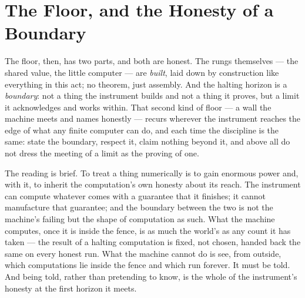 \section{The Floor, and the Honesty of a Boundary}

The floor, then, has two parts, and both are honest. The rungs themselves --- the shared value, the little
computer --- are \emph{built}, laid down by construction like everything in this act; no theorem, just
assembly. And the halting horizon is a \emph{boundary}: not a thing the instrument builds and not a thing it
proves, but a limit it acknowledges and works within. That second kind of floor --- a wall the machine meets and
names honestly --- recurs wherever the instrument reaches the edge of what any finite computer can do, and each
time the discipline is the same: state the boundary, respect it, claim nothing beyond
it, and above all do not dress the meeting of a limit as the proving of one.

The reading is brief. To treat a thing numerically is to gain enormous power and, with it, to inherit the
computation's own honesty about its reach. The instrument can compute whatever comes with a guarantee that it
finishes; it cannot manufacture that guarantee; and the boundary between the two is not the machine's failing but
the shape of computation as such. What the machine computes, once it is inside the fence, is as much the world's
as any count it has taken --- the result of a halting computation is fixed, not chosen, handed back the same on
every honest run. What the machine cannot do is see, from outside, which computations lie inside the fence and
which run forever. It must be told. And being told, rather than pretending to know, is the whole of the
instrument's honesty at the first horizon it meets.
